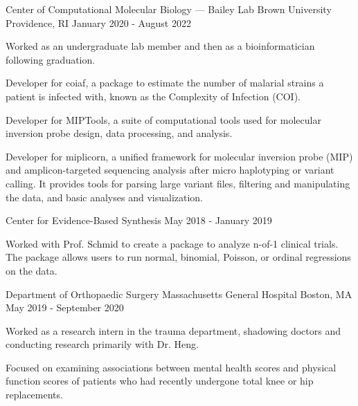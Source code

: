 \begin{cventries}
  \cventry
    {Center of Computational Molecular Biology — Bailey Lab} %
    {Brown University} %
    {Providence, RI} %
    {January 2020 - August 2022} %
    {
      \begin{cvitems} %
        \item {Worked as an undergraduate lab member and then as a 
        bioinformatician following graduation.}
        \item {Developer for coiaf, a package to estimate the number of malarial
        strains a patient is infected with, known as the Complexity of 
        Infection (COI).}
        \item {Developer for MIPTools, a suite of computational tools used for
        molecular inversion probe design, data processing, and analysis.}
        \item {Developer for miplicorn, a unified framework for molecular
        inversion probe (MIP) and amplicon-targeted sequencing analysis after 
        micro haplotyping or variant calling. It provides tools for parsing 
        large variant files, filtering and manipulating the data, and basic 
        analyses and visualization.}
      \end{cvitems}
    }

  \cventry
    {Center for Evidence-Based Synthesis} %
    {} %
    {} %
    {May 2018 - January 2019} %
    {
      \begin{cvitems} %
        \item {Worked with Prof. Schmid to create a package to analyze n-of-1
        clinical trials. The package allows users to run normal, binomial,
        Poisson, or ordinal regressions
        on the data.}
      \end{cvitems}
    }

  \cventry
    {Department of Orthopaedic Surgery} %
    {Massachusetts General Hospital} %
    {Boston, MA} %
    {May 2019 - September 2020} %
    {
      \begin{cvitems} %
        \item {Worked as a research intern in the trauma department, shadowing 
        doctors and conducting research primarily with Dr. Heng.} 
        \item {Focused on examining associations between mental health scores
        and physical function scores of patients who had recently undergone 
        total knee or hip replacements.}
      \end{cvitems}
    }


\end{cventries}
